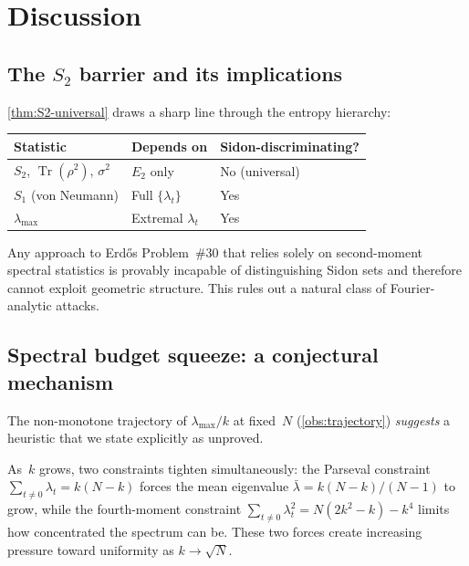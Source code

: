 \documentclass[11pt]{article}
\theoremstyle{definition}
\theoremstyle{remark}
\newcommand{\lmax}{\lambda_{\max}}
\newcommand{\Tr}{\operatorname{Tr}}
\begin{document}
\section{Discussion}\label{sec:discussion}

\subsection{The $S_2$ barrier and its implications}

\cref{thm:S2-universal} draws a sharp line through the entropy hierarchy:

\begin{center}
\begin{tabular}{lll}
\toprule
\textbf{Statistic} & \textbf{Depends on} & \textbf{Sidon-discriminating?} \\
\midrule
$S_2$, $\Tr(\rho^2)$, $\sigma^2$ & $E_2$ only & No (universal) \\
$S_1$ (von Neumann) & Full $\{\lambda_t\}$ & Yes \\
$\lmax$ & Extremal $\lambda_t$ & Yes \\
\bottomrule
\end{tabular}
\end{center}

Any approach to Erd\H{o}s Problem~\#30 that relies solely on
second-moment spectral statistics is provably incapable of
distinguishing Sidon sets and therefore cannot exploit geometric
structure.  This rules out a natural class of Fourier-analytic
attacks.

\subsection{Spectral budget squeeze: a conjectural mechanism}

The non-monotone trajectory of $\lmax/k$ at fixed~$N$
(\cref{obs:trajectory}) \emph{suggests} a heuristic that we
state explicitly as unproved.

As~$k$ grows, two constraints tighten simultaneously:
the Parseval constraint
$\sum_{t \ne 0} \lambda_t = k(N-k)$ forces the mean
eigenvalue $\bar\lambda = k(N-k)/(N-1)$ to grow, while the
fourth-moment constraint
$\sum_{t \ne 0} \lambda_t^2 = N(2k^2-k) - k^4$ limits how
concentrated the spectrum can be.  These two forces create
increasing pressure toward uniformity as $k \to \sqrt{N}$.
\end{document}

